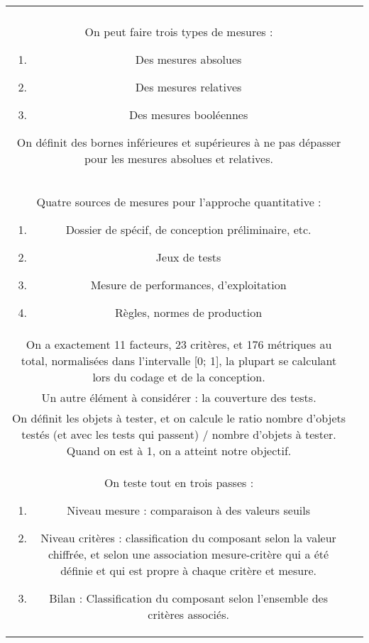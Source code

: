 \begin{tabular}{|c|c|}
\hfill\\

On peut faire trois types de mesures :
\begin{enumerate}
\item Des mesures absolues
\item Des mesures relatives
\item Des mesures booléennes
\end{enumerate}

On définit des bornes inférieures et supérieures à ne pas dépasser pour les mesures absolues et relatives.\\

Quatre sources de mesures pour l’approche quantitative :
\begin{enumerate}
\item Dossier de spécif, de conception préliminaire, etc.
\item Jeux de tests
\item Mesure de performances, d’exploitation
\item Règles, normes de production
\end{enumerate}

\hfill\\

On a exactement 11 facteurs, 23 critères, et 176 métriques au total, normalisées dans l’intervalle [0; 1], la plupart se calculant lors du codage et de la conception.

\hfill\\

Un autre élément à considérer : la couverture des tests.\\
On définit les objets à tester, et on calcule le ratio nombre d’objets testés (et avec les tests qui passent) / nombre d’objets à tester. Quand on est à 1, on a atteint notre objectif.

\hfill\\

On teste tout en trois passes :
\begin{enumerate}
\item Niveau mesure : comparaison à des valeurs seuils
\item Niveau critères : classification du composant selon la valeur chiffrée, et selon une association mesure-critère qui a été définie et qui est propre à chaque critère et mesure.
\item Bilan : Classification du composant selon l’ensemble des critères associés.
\end{enumerate}



\end{tabular}
